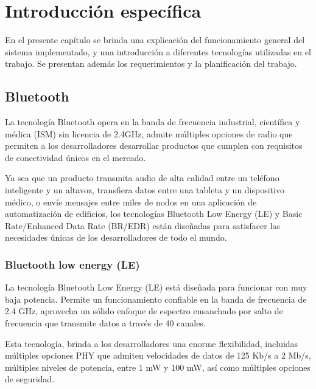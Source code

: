 \chapter{Introducción específica} %

\label{Chapter2}

En el presente capítulo se brinda una explicación del funcionamiento general del sistema implementado, y una introducción a diferentes tecnologías utilizadas en el trabajo. Se presentan además los requerimientos y la planificación del trabajo.

\section{Bluetooth}

La tecnología Bluetooth opera en la banda de frecuencia industrial, científica y médica (ISM) sin licencia de 2.4GHz, admite múltiples opciones de radio que permiten a los desarrolladores desarrollar productos que cumplen con requisitos de conectividad únicos en el mercado. 

Ya sea que un producto transmita audio de alta calidad entre un teléfono inteligente y un altavoz, transfiera datos entre una tableta y un dispositivo médico, o envíe mensajes entre miles de nodos en una aplicación de automatización de edificios, los tecnologías Bluetooth Low Energy (LE) y Basic Rate/Enhanced Data Rate (BR/EDR) están diseñadas para satisfacer las necesidades únicas de los desarrolladores de todo el mundo.


\subsection{Bluetooth low energy (LE)}

La tecnología Bluetooth Low Energy (LE) está diseñada para funcionar con muy baja potencia. Permite un funcionamiento confiable en la banda de frecuencia de 2.4 GHz, aprovecha un sólido enfoque de espectro ensanchado por salto de frecuencia que transmite datos a través de 40 canales.

Esta tecnología, brinda a los desarrolladores una enorme flexibilidad, incluidas múltiples opciones PHY que admiten velocidades de datos de 125 Kb/s a 2 Mb/s, múltiples niveles de potencia, entre 1 mW y 100 mW, así como múltiples opciones de seguridad. 

